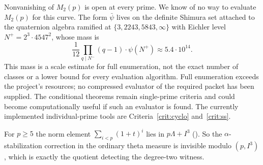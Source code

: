 \begin{remark}\label{rem:m2cost}
Nonvanishing of $M_2(p)$ is open at every prime. We know of no way to evaluate $M_2(p)$ for this curve. The form $\bar\psi$ lives on the definite Shimura set attached to the quaternion algebra ramified at $\{3,2243,5843,\infty\}$ with Eichler level $N^+=2^3\cdot4547^2$, whose mass is
\[
\frac{1}{12}\prod_{q\mid N^-}(q-1)\cdot\psi(N^+)\approx5.4\cdot10^{14} .
\]
This mass is a scale estimate for full enumeration, not the exact number of classes or a lower bound for every evaluation algorithm. Full enumeration exceeds the project's resources; no compressed evaluator of the required packet has been supplied. The conditional theorems remain single-prime criteria and could become computationally useful if such an evaluator is found. The currently implemented individual-prime tools are Criteria~\ref{crit:cyclo} and~\ref{crit:ss}.
\end{remark}

\begin{remark}[Stabilization]\label{rem:invis}
For $p\ge5$ the norm element $\sum_{i<p}(1+t)^i$ lies in $p\Lambda+I^3$ (). So the $\alpha$-stabilization correction in the ordinary theta measure is invisible modulo $(p,I^3)$, which is exactly the quotient detecting the degree-two witness.
\end{remark}
